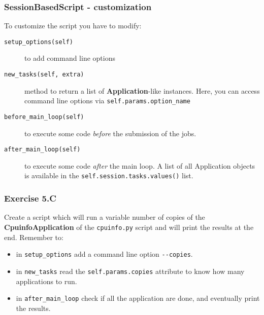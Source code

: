 \documentclass[english,serif,mathserif,xcolor=pdftex,dvipsnames,table]{beamer}
\begin{document}
\begin{frame}
  \frametitle{SessionBasedScript - customization}
To customize the script you have to modify:
\begin{description}
\item [\texttt{setup\_options(self)}] to add command line options
\item [\texttt{new\_tasks(self, extra)}] method to return a list of
  \textbf{Application}-like instances. Here, you can access command
  line options via \lstinline|self.params.option_name|
\item [\texttt{before\_main\_loop(self)}] to execute some code
  \emph{before} the submission of the jobs.
\item [\texttt{after\_main\_loop(self)}] to execute some code
  \emph{after} the main loop. A list of all Application objects is
  available in the \lstinline|self.session.tasks.values()| list.
\end{description}
\end{frame}


\begin{frame}
  \frametitle{Exercise 5.C} Create a script which will run a variable
  number of copies of the \textbf{CpuinfoApplication} of the
  \lstinline|cpuinfo.py| script and will print the results at the
  end. Remember to:
  \begin{itemize}
  \item in \lstinline|setup_options| add a command line option
    \lstinline|--copies|.
  \item in \lstinline|new_tasks| read the
    \lstinline|self.params.copies| attribute to know how many
    applications to run.
  \item in \lstinline|after_main_loop| check if all the application
    are done, and eventually print the results.
  \end{itemize}
\end{frame}





\end{document}
